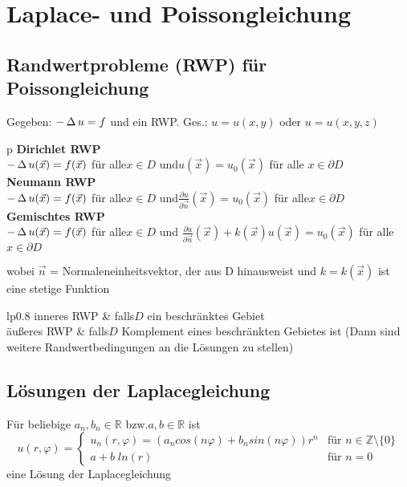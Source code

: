\documentclass[german,color,5pt]{latex4ei/latex4ei_fs}
\begin{document}
\section{Laplace- und Poissongleichung}
\begin{sectionbox}
	\subsection{Randwertprobleme (RWP) für Poissongleichung}
	Gegeben: $-\operatorname{\Delta} u = f$ und ein RWP. Ges.: $u=u(x,y)$ oder $u=u(x,y,z)$
	\begin{tablebox}{p{\textwidth}}
		\textbf{Dirichlet RWP}\\
		$-\operatorname{\Delta} u(\vec x)=f(\vec x) $ für alle$x \in D $ und$u(\vec x)=u_{0}(\vec x) $ für alle $x \in \partial D$ \\
		\textbf{Neumann RWP}\\
		$-\operatorname{\Delta} u(\vec x)=f(\vec x) $ für alle$x \in D $ und$\frac{\partial u}{\partial \vec n}(\vec x)=u_{0}(\vec x) $ für alle$x \in \partial D $ \\
		\textbf{Gemischtes RWP} \\
		$-\operatorname{\Delta} u(\vec x)=f(\vec x) $ für alle$x \in D $ und $\frac{\partial u}{\partial \vec n}(\vec x)+k(\vec x)u(\vec x)=u_{0}(\vec x) $ für alle $x \in \partial D $ \\
	\end{tablebox}
	wobei $\vec n$ = Normaleneinheitsvektor, der aus D hinausweist und $k=k(\vec x)$ ist eine stetige Funktion
	\begin{tablebox}{lp{0.8\textwidth}}
		inneres RWP & falls$D$ ein beschränktes Gebiet \\
		äußeres RWP & falls$D$ Komplement eines beschränkten Gebietes ist (Dann sind weitere Randwertbedingungen an die Lösungen zu stellen)
	\end{tablebox}
	
	\subsection{Lösungen der Laplacegleichung}
	
	Für beliebige $a_{n},b_{n} \in \mathbb{R}$ bzw.$a,b \in \mathbb{R} $ ist
	\begin{equation*}
		u(r,\varphi)=
		\begin{cases}
		u_{n}(r,\varphi)=(a_{n}cos(n \varphi)+b_{n}sin(n \varphi))r^{n} & \text{für } n \in \mathbb{Z}\setminus\{0\}
		\\
		a+b \; ln(r) & \text{für } n=0
		\end{cases}
	\end{equation*} 
	eine Lösung der Laplacegleichung
\end{sectionbox}


\end{document}
